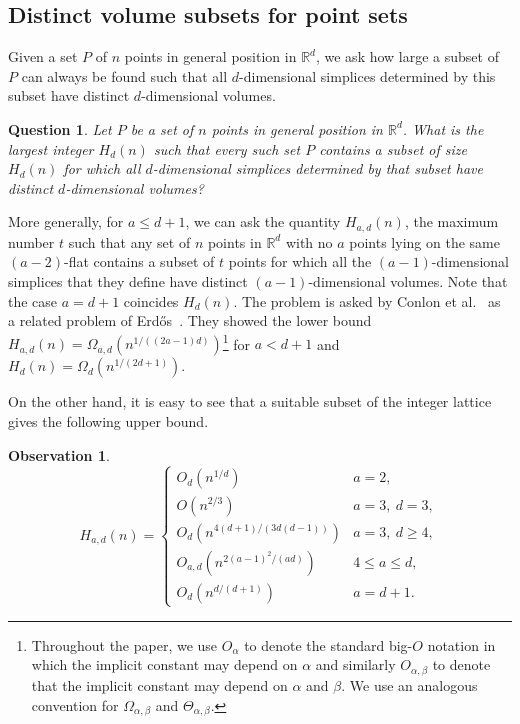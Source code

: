 \documentclass[a4paper,oneside,10pt]{amsart}
\newtheorem{obs}{Observation}
\newtheorem{que}{Question}
\begin{document}
\subsection{Distinct volume subsets for point sets}
Given a set \(P\) of \(n\) points in general position in \(\mathbb R^d\), we ask how large a subset of \(P\) can always be found such that all \(d\)-dimensional simplices determined by this subset have distinct \(d\)-dimensional volumes.

\begin{que} \label{que1}
Let \(P\) be a set of \(n\) points in general position in \(\mathbb R^d\).
What is the largest integer \(H_d(n)\) such that every such set \(P\) contains a subset of size \(H_d(n)\) for which all \(d\)-dimensional simplices determined by that subset have distinct \(d\)-dimensional volumes?
\end{que}

More generally, for $a \leq d+1$, we can ask the quantity $H_{a,d} (n)$, the maximum number $t$ such that any set of $n$ points in $\mathbb{R}^d$ with no $a$ points lying on the same $(a-2)$-flat contains a subset of $t$ points for which all the $(a-1)$-dimensional simplices that they define have distinct $(a-1)$-dimensional volumes.
Note that the case $a=d+1$ coincides $H_d (n)$.
The problem is asked by Conlon et al.~\cite{conlon2015distinct} as a related problem of Erd\H{o}s~\cite{erdos1946sets}.
They showed the lower bound $H_{a,d} (n) = \Omega_{a,d} (n^{1/((2a-1)d)})$\footnote{Throughout the paper, we use $O_\alpha$ to denote the standard big-$O$ notation in which the implicit constant may depend on $\alpha$ and similarly $O_{\alpha,\beta}$ to denote
that the implicit constant may depend on $\alpha$ and $\beta$. We use an analogous convention for $\Omega_{\alpha,\beta}$ and $\Theta_{\alpha,\beta}$.} for $a < d+1$ and $H_d (n) = \Omega_d (n^{1/(2d+1)})$.

On the other hand, it is easy to see that a suitable subset of the integer lattice gives the following upper bound.

\begin{obs} \label{obs:h_{a,d}}
\[
H_{a,d}(n)=
\begin{cases}
O_d (n^{1/d}) & a=2,\\[2mm]
O(n^{2/3}) & a=3,\ d=3,\\[2mm]
O_d\!\left(n^{4(d+1)/(3d(d-1))}\right) & a=3,\ d\ge 4,\\[3mm]
O_{a,d}\!\left(n^{2(a-1)^2/(ad)}\right) & 4\le a\le d,\\[3mm]
O_d\!\left(n^{d/(d+1)}\right) & a=d+1.
\end{cases}
\]

\end{obs}
\end{document}

